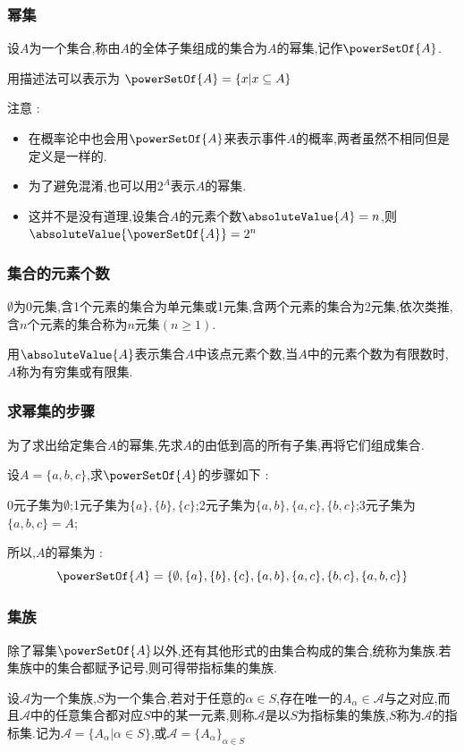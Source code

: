 {{\subsubsection{幂集}{
  设$A$为一个集合,称由$A$的全体子集组成的集合为$A$的幂集,记作$\powerSetOf{A}$.

  用描述法可以表示为 $\powerSetOf{A} = \{x | x \subseteq A\}$

  注意 :

  \begin{itemize}
    \item 在概率论中也会用$\powerSetOf{A}$来表示事件$A$的概率,两者虽然不相同但是定义是一样的.
    \item 为了避免混淆,也可以用$2^A$表示$A$的幂集.
    \item 这并不是没有道理,设集合$A$的元素个数$\absoluteValue{A} = n$,则$\absoluteValue{\powerSetOf{A}} = 2^n$
  \end{itemize}
}%

\subsubsection{集合的元素个数}{
  $\emptyset$为$0$元集,含1个元素的集合为单元集或1元集,含两个元素的集合为2元集,依次类推,含$n$个元素的集合称为$n$元集$(n \geq 1)$.

  用$\absoluteValue{A}$表示集合$A$中该点元素个数,当$A$中的元素个数为有限数时,$A$称为有穷集或有限集.
}%

\subsubsection{求幂集的步骤}{
  为了求出给定集合$A$的幂集,先求$A$的由低到高的所有子集,再将它们组成集合.

  设$A = \{a,b,c\}$,求$\powerSetOf{A}$的步骤如下 :

  0元子集为$\emptyset$;1元子集为$\{a\},\{b\},\{c\}$;2元子集为$\{a,b\},\{a,c\},\{b,c\}$;3元子集为$\{a,b,c\} = A$;

  所以,$A$的幂集为 : $$
    \powerSetOf{A} = \{\emptyset,\{a\},\{b\},\{c\},\{a,b\},\{a,c\},\{b,c\},\{a,b,c\}\}
  $$
}%

\subsubsection{集族}{
除了幂集$\powerSetOf{A}$以外,还有其他形式的由集合构成的集合,统称为集族.若集族中的集合都赋予记号,则可得带指标集的集族.

设$\mathcal{A}$为一个集族,$S$为一个集合,若对于任意的$\alpha \in S$,存在唯一的$A_\alpha \in \mathcal{A}$与之对应,而且$\mathcal{A}$中的任意集合都对应$S$中的某一元素,则称$\mathcal{A}$是以$S$为指标集的集族,$S$称为$\mathcal{A}$的指标集.记为$\mathcal{A} = \{A_\alpha | \alpha \in S\}$,或$\mathcal{A} = \{A_\alpha\}_{\alpha \in S}$

}}}
